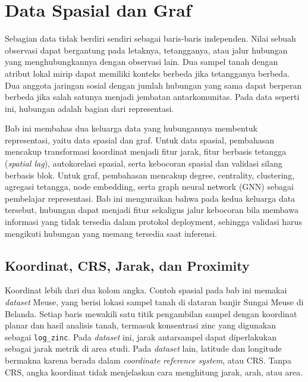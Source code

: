 \chapter{Data Spasial dan Graf}\label{data-spasial-dan-graf}

Sebagian data tidak berdiri sendiri sebagai baris-baris independen. Nilai sebuah observasi dapat bergantung pada letaknya, tetangganya, atau jalur hubungan yang menghubungkannya dengan observasi lain. Dua sampel tanah dengan atribut lokal mirip dapat memiliki konteks berbeda jika tetangganya berbeda. Dua anggota jaringan sosial dengan jumlah hubungan yang sama dapat berperan berbeda jika salah satunya menjadi jembatan antarkomunitas. Pada data seperti ini, hubungan adalah bagian dari representasi.

Bab ini membahas dua keluarga data yang hubungannya membentuk representasi, yaitu data spasial dan graf. Untuk data spasial, pembahasan mencakup transformasi koordinat menjadi fitur jarak, fitur berbasis tetangga (\emph{spatial lag}), autokorelasi spasial, serta kebocoran spasial dan validasi silang berbasis blok. Untuk graf, pembahasan mencakup degree, centrality, clustering, agregasi tetangga, node embedding, serta graph neural network (GNN) sebagai pembelajar representasi. Bab ini menguraikan bahwa pada kedua keluarga data tersebut, hubungan dapat menjadi fitur sekaligus jalur kebocoran bila membawa informasi yang tidak tersedia dalam protokol deployment, sehingga validasi harus mengikuti hubungan yang memang tersedia saat inferensi.

\section{Koordinat, CRS, Jarak, dan Proximity}\label{koordinat-crs-jarak-dan-proximity}

Koordinat lebih dari dua kolom angka. Contoh spasial pada bab ini memakai \emph{dataset} Meuse, yang berisi lokasi sampel tanah di dataran banjir Sungai Meuse di Belanda. Setiap baris mewakili satu titik pengambilan sampel dengan koordinat planar dan hasil analisis tanah, termasuk konsentrasi zinc yang digunakan sebagai \passthrough{\lstinline!log_zinc!}. Pada \emph{dataset} ini, jarak antarsampel dapat diperlakukan sebagai jarak metrik di area studi. Pada \emph{dataset} lain, latitude dan longitude bermakna karena berada dalam \emph{coordinate reference system}, atau CRS. Tanpa CRS, angka koordinat tidak menjelaskan cara menghitung jarak, arah, atau area.

